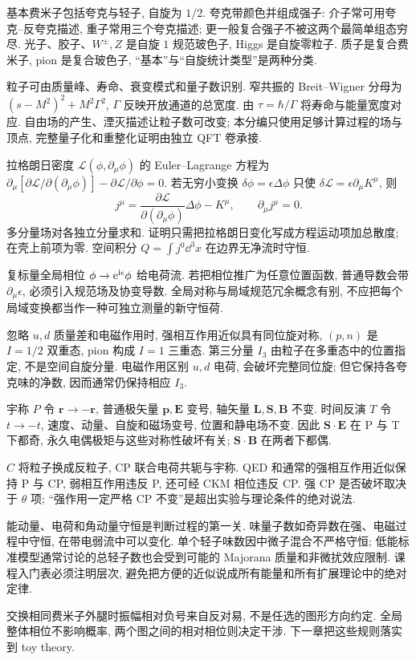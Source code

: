 \label{ch:symmetry}
基本费米子包括夸克与轻子, 自旋为 $1/2$. 夸克带颜色并组成强子: 介子常可用夸克--反夸克描述, 重子常用三个夸克描述; 更一般复合强子不被这两个最简单组态穷尽. 光子、胶子、$W^\pm,Z$ 是自旋 $1$ 规范玻色子, Higgs 是自旋零粒子. 质子是复合费米子, pion 是复合玻色子, ``基本''与``自旋统计类型''是两种分类.

粒子可由质量峰、寿命、衰变模式和量子数识别. 窄共振的 Breit--Wigner 分母为 $(s-M^2)^2+M^2\Gamma^2$, $\Gamma$ 反映开放通道的总宽度. 由 $\tau=\hbar/\Gamma$ 将寿命与能量宽度对应. 自由场的产生、湮灭描述让粒子数可改变; 本分编只使用足够计算过程的场与顶点, 完整量子化和重整化证明由独立 QFT 卷承接.

拉格朗日密度 $\mathcal L(\phi,\partial_\mu\phi)$ 的 Euler--Lagrange 方程为
$\partial_\mu[\partial\mathcal L/\partial(\partial_\mu\phi)]-\partial\mathcal L/\partial\phi=0$. 若无穷小变换 $\delta\phi=\epsilon\Delta\phi$ 只使 $\delta\mathcal L=\epsilon\partial_\mu K^\mu$, 则
\begin{equation}
 j^\mu=\frac{\partial\mathcal L}{\partial(\partial_\mu\phi)}\Delta\phi-K^\mu,\qquad\partial_\mu j^\mu=0.
\end{equation}
多分量场对各独立分量求和. 证明只需把拉格朗日变化写成方程运动项加总散度; 在壳上前项为零. 空间积分 $Q=\int j^0\dd^3x$ 在边界无净流时守恒.

复标量全局相位 $\phi\to\mathrm e^{\mathrm i\epsilon}\phi$ 给电荷流. 若把相位推广为任意位置函数, 普通导数会带 $\partial_\mu\epsilon$, 必须引入规范场及协变导数. 全局对称与局域规范冗余概念有别, 不应把每个局域变换都当作一种可独立测量的新守恒荷.

忽略 $u,d$ 质量差和电磁作用时, 强相互作用近似具有同位旋对称, $(p,n)$ 是 $I=1/2$ 双重态, pion 构成 $I=1$ 三重态. 第三分量 $I_3$ 由粒子在多重态中的位置指定, 不是空间自旋分量. 电磁作用区别 $u,d$ 电荷, 会破坏完整同位旋; 但它保持各夸克味的净数, 因而通常仍保持相应 $I_3$.

宇称 $P$ 令 $\mathbf r\to-\mathbf r$, 普通极矢量 $\mathbf p,\mathbf E$ 变号, 轴矢量 $\mathbf L,\mathbf S,\mathbf B$ 不变. 时间反演 $T$ 令 $t\to-t$, 速度、动量、自旋和磁场变号, 位置和静电场不变. 因此 $\mathbf S\cdot\mathbf E$ 在 P 与 T 下都奇, 永久电偶极矩与这些对称性破坏有关; $\mathbf S\cdot\mathbf B$ 在两者下都偶.

$C$ 将粒子换成反粒子, CP 联合电荷共轭与宇称. QED 和通常的强相互作用近似保持 P 与 CP, 弱相互作用违反 P, 还可经 CKM 相位违反 CP. 强 CP 是否破坏取决于 $\theta$ 项; ``强作用一定严格 CP 不变''是超出实验与理论条件的绝对说法.

能动量、电荷和角动量守恒是判断过程的第一关. 味量子数如奇异数在强、电磁过程中守恒, 在带电弱流中可以变化. 单个轻子味数因中微子混合不严格守恒; 低能标准模型通常讨论的总轻子数也会受到可能的 Majorana 质量和非微扰效应限制. 课程入门表必须注明层次, 避免把方便的近似说成所有能量和所有扩展理论中的绝对定律.

交换相同费米子外腿时振幅相对负号来自反对易, 不是任选的图形方向约定. 全局整体相位不影响概率, 两个图之间的相对相位则决定干涉. 下一章把这些规则落实到 toy theory.
